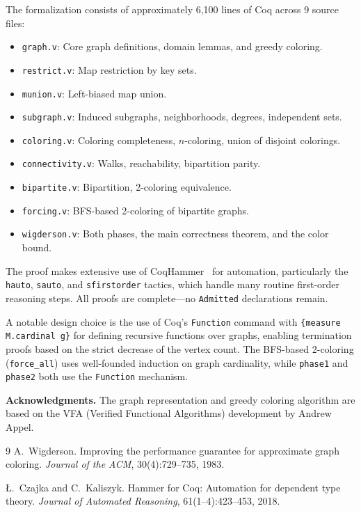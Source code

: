 \documentclass[11pt]{article}
\theoremstyle{plain}
\theoremstyle{definition}
\theoremstyle{remark}
\begin{document}
The formalization consists of approximately 6{,}100 lines of Coq across 9 source files:
\begin{itemize}[nosep]
  \item \texttt{graph.v}: Core graph definitions, domain lemmas, and greedy coloring.
  \item \texttt{restrict.v}: Map restriction by key sets.
  \item \texttt{munion.v}: Left-biased map union.
  \item \texttt{subgraph.v}: Induced subgraphs, neighborhoods, degrees, independent sets.
  \item \texttt{coloring.v}: Coloring completeness, $n$-coloring, union of disjoint colorings.
  \item \texttt{connectivity.v}: Walks, reachability, bipartition parity.
  \item \texttt{bipartite.v}: Bipartition, 2-coloring equivalence.
  \item \texttt{forcing.v}: BFS-based 2-coloring of bipartite graphs.
  \item \texttt{wigderson.v}: Both phases, the main correctness theorem, and the color bound.
\end{itemize}

The proof makes extensive use of CoqHammer~\cite{coqhammer} for automation, particularly the \texttt{hauto}, \texttt{sauto}, and \texttt{sfirstorder} tactics, which handle many routine first-order reasoning steps. All proofs are complete---no \texttt{Admitted} declarations remain.

A notable design choice is the use of Coq's \texttt{Function} command with \texttt{\{measure M.cardinal g\}} for defining recursive functions over graphs, enabling termination proofs based on the strict decrease of the vertex count. The BFS-based 2-coloring (\texttt{force\_all}) uses well-founded induction on graph cardinality, while \texttt{phase1} and \texttt{phase2} both use the \texttt{Function} mechanism.

\bigskip
\noindent\textbf{Acknowledgments.} The graph representation and greedy coloring algorithm are based on the VFA (Verified Functional Algorithms) development by Andrew Appel.

\begin{thebibliography}{9}
A.~Wigderson.
\newblock Improving the performance guarantee for approximate graph coloring.
\newblock \emph{Journal of the ACM}, 30(4):729--735, 1983.

\L.~Czajka and C.~Kaliszyk.
\newblock Hammer for {C}oq: Automation for dependent type theory.
\newblock \emph{Journal of Automated Reasoning}, 61(1--4):423--453, 2018.
\end{thebibliography}
\end{document}
